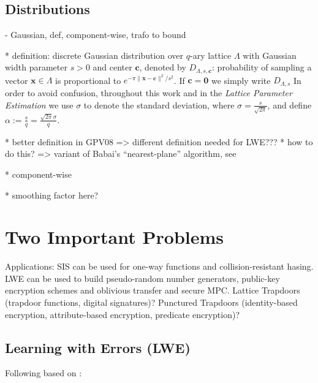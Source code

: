 \documentclass[
  a4paper,  %
  twoside,  %
  bibliography=totoc,
  headsepline,
  cleardoublepage=empty,
  parskip=half,
  draft=false
]{scrbook}
\begin{document}
\subsection{Distributions}

- Gaussian, def, component-wise, trafo to bound %

* definition:
discrete Gaussian distribution over $q$-ary lattice $\Lambda$ with Gaussian width parameter $s > 0$ and center $\mathbf{c}$, denoted by $D_{\Lambda, s, \mathbf{c}}$: probability of sampling a vector $\mathbf{x}\in \Lambda$ is proportional to $e^{-\pi \|\mathbf{x} - \mathbf{c}\|^2/s^2}$. If $\mathbf{c} = \mathbf{0}$ we simply write  $D_{\Lambda, s}$ %
In order to avoid confusion, throughout this work and in the \textit{Lattice Parameter Estimation} we use $\sigma$ to denote the standard deviation, where $\sigma = \frac{s}{\sqrt{2 \pi}}$, and define $\alpha := \frac{s}{q} = \frac{\sqrt{2\pi} \sigma}{q}$.

* better definition in GPV08 => different definition needed for LWE??? %
* how to do this? => variant of Babai's ``nearest-plane'' algorithm, see \cite{GPV08} %

* component-wise

* smoothing factor here?











\section{Two Important Problems}\label{sec:problems}
Applications: SIS can be used for one-way functions and collision-resistant hasing. LWE can be used to build pseudo-random number generators, public-key encryption schemes and oblivious transfer and secure MPC. Lattice Trapdoors (trapdoor functions, digital signatures)? Punctured Trapdoors (identity-based encryption, attribute-based encryption, predicate encryption)? %

\subsection{Learning with Errors (LWE)} \label{sec:lwe}
Following based on \cite{Reg10}:%
\end{document}
